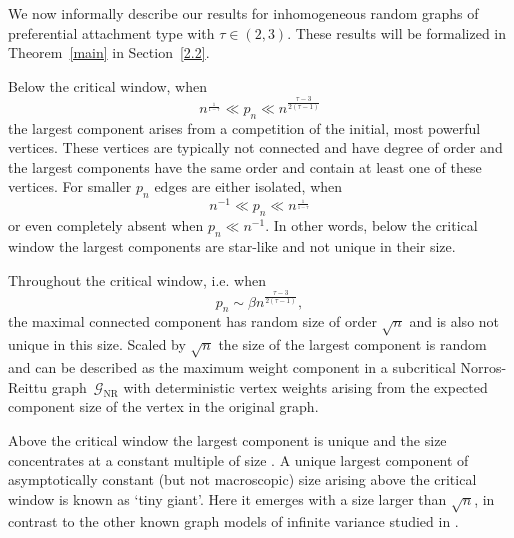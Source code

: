 \documentclass[12pt,a4paper]{article}
\numberwithin{equation}{section}
\begin{document}
We now informally describe our results for inhomogeneous random graphs of preferential attachment type with $\tau\in(2,3)$. These results will be formalized in Theorem~\ref{main} in Section~\ref{2.2}.
\smallskip

Below the critical window, when%
$$
n^{_{\frac1{1-\tau}}} \ll p_n \ll  n^{\frac{\tau-3}{2(\tau-1)}}
$$
the largest component arises from a competition of the initial, most powerful vertices. These vertices are typically not connected and have degree of order  
and the largest components have the same order and contain at least one of these vertices. For smaller $p_n$ edges are either isolated, when 
$$
n^{-1} \ll p_n \ll  n^{_{\frac1{1-\tau}}}
$$
or even completely absent when $p_n\ll n^{-1}$. In other words, below the critical window the largest components are star-like and  not unique in their size. \smallskip

Throughout the critical window, i.e. when
$$p_n \sim \beta n^{\frac{\tau-3}{2(\tau-1)}},$$ 
the maximal connected component has random size of order $\sqrt{n}$ and is also not unique in this size. Scaled by $\sqrt{n}$ the size of the largest component is random and can be described as the maximum weight component in a subcritical Norros-Reittu graph~$\mathscr G_{\text{NR}}$ with deterministic vertex weights arising from the expected component  size of the vertex in the original graph.
\smallskip

Above the critical window the largest component is unique and the size concentrates at a constant multiple of size . A unique largest component of asymptotically constant (but not macroscopic)  size arising above the 
critical window is known as `tiny giant'. Here it emerges with a size larger than $\sqrt{n}$, in contrast to the other known graph models of infinite variance studied in \cite{BDH, DHL}.
\end{document}
